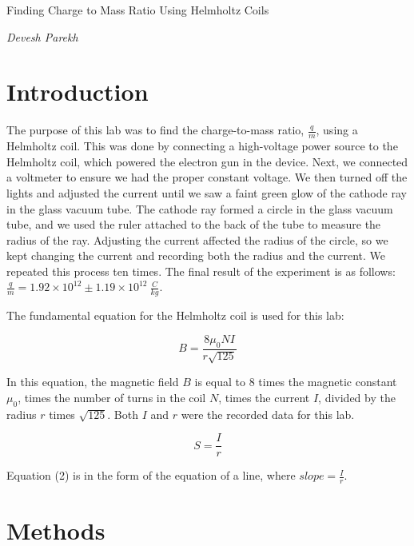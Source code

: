 \documentclass[onecolumn]{article}
\begin{document}
\begin{center}

{\Huge Finding Charge to Mass Ratio Using Helmholtz Coils}\vskip 20pt

{\huge \em Devesh Parekh}

\end{center}

\section*{Introduction}

The purpose of this lab was to find the charge-to-mass ratio, $\frac{q}{m}$, using a Helmholtz coil. This was done by connecting a high-voltage power source to the Helmholtz coil, which powered the electron gun in the device. Next, we connected a voltmeter to ensure we had the proper constant voltage. We then turned off the lights and adjusted the current until we saw a faint green glow of the cathode ray in the glass vacuum tube. The cathode ray formed a circle in the glass vacuum tube, and we used the ruler attached to the back of the tube to measure the radius of the ray. Adjusting the current affected the radius of the circle, so we kept changing the current and recording both the radius and the current. We repeated this process ten times. The final result of the experiment is as follows: $\frac{q}{m}=1.92\times10^{12}\pm1.19\times10^{12}\ \frac{C}{kg}$.

The fundamental equation for the Helmholtz coil is used for this lab:

\begin{equation}
B=\frac{8\mu_0NI}{r\sqrt{125}}
\end{equation}

In this equation, the magnetic field $B$ is equal to $8$ times the magnetic constant $\mu_0$, times the number of turns in the coil $N$, times the current $I$, divided by the radius $r$ times $\sqrt{125}$. Both $I$ and $r$ were the recorded data for this lab.

\begin{equation}
S=\frac{I}{r}
\end{equation}

Equation (2) is in the form of the equation of a line, where $slope=\frac{I}{r}$.

\section*{Methods}
\end{document}

